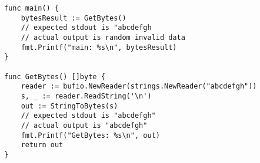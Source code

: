 \begin{lstlisting}[language=Golang, label=lst:escape-analysis-flaw, caption=Escape analysis flaw proof of concept]
func main() {
    bytesResult := GetBytes()
    // expected stdout is "abcdefgh
    // actual output is random invalid data
    fmt.Printf("main: %s\n", bytesResult)
}

func GetBytes() []byte {
    reader := bufio.NewReader(strings.NewReader("abcdefgh"))
    s, _ := reader.ReadString('\n')
    out := StringToBytes(s)
    // expected stdout is "abcdefgh"
    // actual output is "abcdefgh"
    fmt.Printf("GetBytes: %s\n", out)
    return out
}
\end{lstlisting}